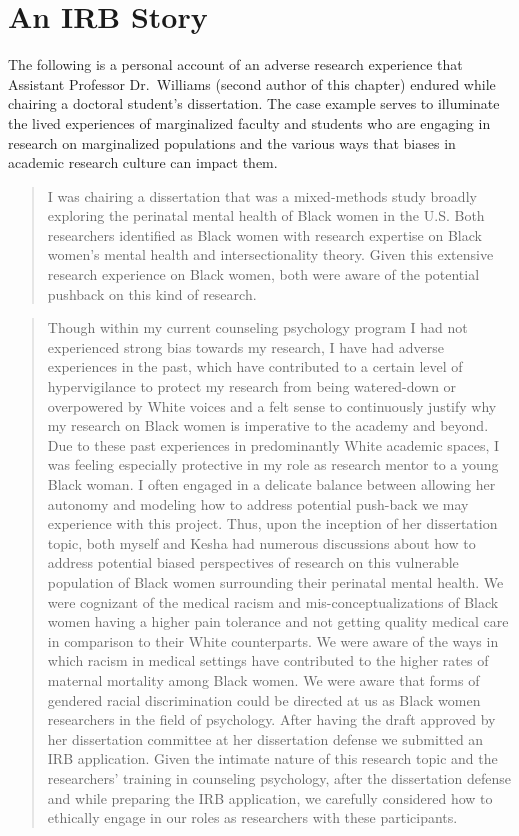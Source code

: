 \documentclass[
  11pt,
]{book}
\begin{document}
\section{An IRB Story}\label{an-irb-story}

The following is a personal account of an adverse research experience that Assistant Professor Dr.~Williams (second author of this chapter) endured while chairing a doctoral student's dissertation. The case example serves to illuminate the lived experiences of marginalized faculty and students who are engaging in research on marginalized populations and the various ways that biases in academic research culture can impact them.

\begin{quote}
I was chairing a dissertation that was a mixed-methods study broadly exploring the perinatal mental health of Black women in the U.S. Both researchers identified as Black women with research expertise on Black women's mental health and intersectionality theory. Given this extensive research experience on Black women, both were aware of the potential pushback on this kind of research.
\end{quote}

\begin{quote}
Though within my current counseling psychology program I had not experienced strong bias towards my research, I have had adverse experiences in the past, which have contributed to a certain level of hypervigilance to protect my research from being watered-down or overpowered by White voices and a felt sense to continuously justify why my research on Black women is imperative to the academy and beyond. Due to these past experiences in predominantly White academic spaces, I was feeling especially protective in my role as research mentor to a young Black woman. I often engaged in a delicate balance between allowing her autonomy and modeling how to address potential push-back we may experience with this project. Thus, upon the inception of her dissertation topic, both myself and Kesha had numerous discussions about how to address potential biased perspectives of research on this vulnerable population of Black women surrounding their perinatal mental health. We were cognizant of the medical racism and mis-conceptualizations of Black women having a higher pain tolerance and not getting quality medical care in comparison to their White counterparts. We were aware of the ways in which racism in medical settings have contributed to the higher rates of maternal mortality among Black women. We were aware that forms of gendered racial discrimination could be directed at us as Black women researchers in the field of psychology. After having the draft approved by her dissertation committee at her dissertation defense we submitted an IRB application. Given the intimate nature of this research topic and the researchers' training in counseling psychology, after the dissertation defense and while preparing the IRB application, we carefully considered how to ethically engage in our roles as researchers with these participants.
\end{quote}
\end{document}
